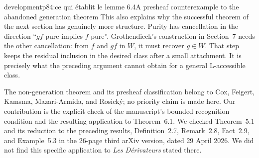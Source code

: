 \begin{dcomment}{development}{p84:ce qui établit le lemme 6.4}{A presheaf counterexample to the abandoned generation theorem}
This also explains why the successful theorem of the next section has genuinely more structure. Purity has cancellation in the direction ``$gf$ pure implies $f$ pure''. Grothendieck's construction in Section~7 needs the other cancellation: from $f$ and $gf$ in $W$, it must recover $g\in W$. That step keeps the residual inclusion in the desired class after a small attachment. It is precisely what the preceding argument cannot obtain for a general L-accessible class.

The non-generation theorem and its presheaf classification belong to Cox, Feigert, Kamsma, Mazari-Armida, and Rosick\'{y}; no priority claim is made here. Our contribution is the explicit check of the manuscript's bounded recognition condition and the resulting application to Theorem~6.1. We checked Theorem~5.1 and its reduction to the preceding results, Definition~2.7, Remark~2.8, Fact~2.9, and Example~5.3 in the 26-page third arXiv version, dated 29 April 2026. We did not find this specific application to \emph{Les D\'erivateurs} stated there.
\end{dcomment}

